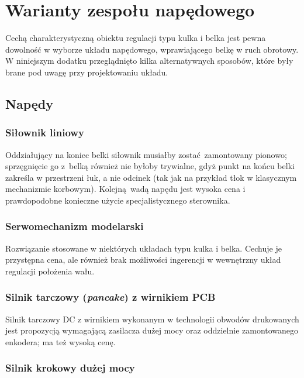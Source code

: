 \chapter{Warianty zespołu napędowego}
\label{appA_warianty_zespolu_napedowego}

Cechą charakterystyczną obiektu regulacji typu kulka i belka jest pewna dowolność w wyborze układu napędowego, wprawiającego belkę w ruch obrotowy. W niniejszym dodatku przeglądnięto kilka alternatywnych sposobów, które były brane pod uwagę przy projektowaniu układu.

\section{Napędy}

\subsection{Siłownik liniowy}

Oddziałujący na koniec belki siłownik musiałby zostać zamontowany pionowo; sprzęgnięcie go z~belką również nie byłoby trywialne, gdyż punkt na końcu belki zakreśla w przestrzeni łuk, a nie odcinek (tak jak na przykład tłok w klasycznym mechanizmie korbowym). Kolejną wadą napędu jest wysoka cena i prawdopodobne konieczne użycie specjalistycznego sterownika.

\subsection{Serwomechanizm modelarski}

Rozwiązanie stosowane w niektórych układach typu kulka i belka. Cechuje je przystępna cena, ale również brak możliwości ingerencji w wewnętrzny układ regulacji położenia wału.

\subsection{Silnik tarczowy (\textit{pancake}) z wirnikiem PCB}

Silnik tarczowy DC z wirnikiem wykonanym w technologii obwodów drukowanych jest propozycją wymagającą zasilacza dużej mocy oraz oddzielnie zamontowanego enkodera; ma też wysoką cenę.

\subsection{Silnik krokowy dużej mocy}


